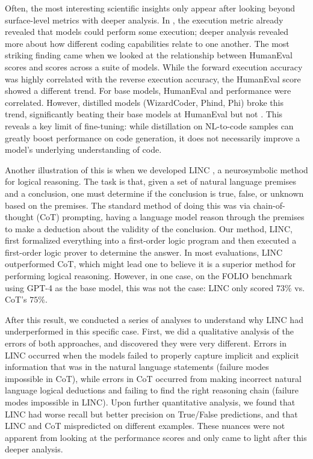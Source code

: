Often, the most interesting scientific insights only appear after looking beyond surface-level metrics
with deeper analysis. In \benchmark{}, the execution metric already revealed that models could perform some execution;
deeper analysis revealed more about how different coding capabilities relate to one another. The most striking finding
came when we looked at the relationship between HumanEval scores and \benchmark{} scores across a suite of models. While the
forward execution accuracy was highly correlated with the reverse execution accuracy, the HumanEval score showed a different
trend. For base models, HumanEval and \benchmark{} performance were correlated.
However, distilled models (WizardCoder, Phind, Phi) broke this trend, significantly beating their base models at HumanEval but
not \benchmark. This reveals a key limit of fine-tuning: while distillation on NL-to-code samples can greatly boost performance on
code generation, it does not necessarily improve a model's underlying understanding of code.

Another illustration of this is when we developed LINC \citep{olausson2023linc}, a neurosymbolic method for logical reasoning.
The task is that, given a set of natural language premises and a conclusion, one must determine if the conclusion
is true, false, or unknown based on the premises. The standard method of doing this was via chain-of-thought (CoT)
prompting, having a language model reason through the premises to make a deduction about the validity of the conclusion.
Our method, LINC, first formalized everything into a first-order logic program and then executed a first-order logic prover
to determine the answer. In most evaluations, LINC outperformed CoT, which might lead one to believe it is
a superior method for performing logical reasoning. However, in one case, on the FOLIO benchmark \citep{han2022folio}
using GPT-4 as the base model, this was not the case: LINC only scored $73\%$ vs. CoT's $75\%$. 

After this result, we conducted a series of analyses to understand why LINC had underperformed in this
specific case. First, we did a qualitative analysis of the errors of both approaches, and discovered they were very 
different. Errors in LINC occurred when the models failed to properly capture implicit and explicit information that was 
in the natural language statements (failure modes impossible in CoT), while errors in CoT occurred from making incorrect natural language logical deductions
and failing to find the right reasoning chain (failure modes impossible in LINC). Upon further quantitative analysis, we found
that LINC had worse recall but better precision on True/False predictions, and that LINC and CoT mispredicted on different examples.
These nuances were not apparent from looking at the performance scores and only came to light after
this deeper analysis.

